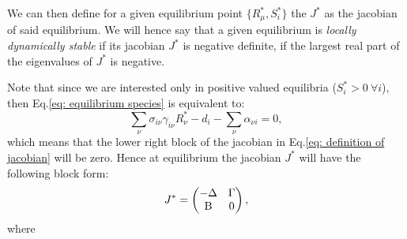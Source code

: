 \documentclass[12pt, titlepage]{report}
\begin{document}
We can then define for a given equilibrium point $\{R^*_\mu, S^*_i\}$ the  $J^*$ as the jacobian of said equilibrium.
We will hence say that a given equilibrium is \textit{locally dynamically stable} if its jacobian $J^*$ is negative definite, \ie if the largest real part of the eigenvalues of $J^*$ is negative.

Note that since we are interested only in positive valued equilibria (\ie $S^*_i > 0 \ \forall i$), then Eq.\eqref{eq: equilibrium species} is equivalent to:
\begin{equation}
  \sum_\nu \sigma_{i\nu} \gamma_{i\nu}R^*_\nu -d_i - \sum_\nu \alpha_{\nu i} = 0,
\end{equation}
which means that the lower right block of the jacobian in Eq.\eqref{eq: definition of jacobian} will be zero. Hence at equilibrium the jacobian $J^*$ will have the following block form:
\begin{equation}
  J^* = \begin{pmatrix}
  -\Delta & \Gamma \\
  \text{B} & 0
\end{pmatrix}, \label{eq: jacobian at equilibrium}
\end{equation}
where

\begin{centering}
\end{centering}
\end{document}
